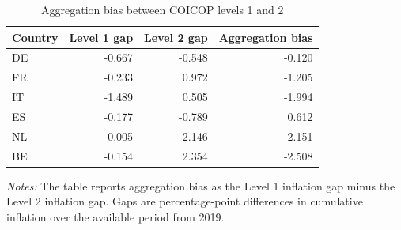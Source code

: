 \begin{table}

\caption{\label{tab:aggregation-bias-level1-level2}Aggregation bias between COICOP levels 1 and 2}
\centering
\begin{tabular}[t]{lrrr}
\toprule
Country & Level 1 gap & Level 2 gap & Aggregation bias\\
\midrule
DE & -0.667 & -0.548 & -0.120\\
FR & -0.233 & 0.972 & -1.205\\
IT & -1.489 & 0.505 & -1.994\\
ES & -0.177 & -0.789 & 0.612\\
NL & -0.005 & 2.146 & -2.151\\
\addlinespace
BE & -0.154 & 2.354 & -2.508\\
\bottomrule
\end{tabular}
\end{table}
\begin{flushleft}
\footnotesize{\emph{Notes:} The table reports aggregation bias as the Level 1 inflation gap minus the Level 2 inflation gap. Gaps are percentage-point differences in cumulative inflation over the available period from 2019.}
\end{flushleft}
